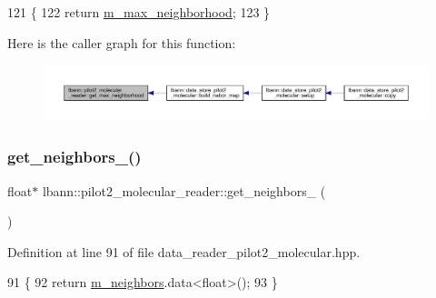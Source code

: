 \begin{DoxyCode}
121                                    \{
122     \textcolor{keywordflow}{return} \hyperlink{classlbann_1_1pilot2__molecular__reader_a0c9e71035cf47191002d1b164d056f50}{m\_max\_neighborhood};
123   \}
\end{DoxyCode}
Here is the caller graph for this function\+:\nopagebreak
\begin{figure}[H]
\begin{center}
\leavevmode
\includegraphics[width=350pt]{classlbann_1_1pilot2__molecular__reader_a1dcc424e004681f9287453df64bb751f_icgraph}
\end{center}
\end{figure}
\mbox{\label{classlbann_1_1pilot2__molecular__reader_a5f3ad4f22a32db2af4a8136fdc0579eb}} 
\subsubsection{\texorpdfstring{get\+\_\+neighbors\+\_()}{get\_neighbors\_4()}}
{\footnotesize\ttfamily float$\ast$ lbann\+::pilot2\+\_\+molecular\+\_\+reader\+::get\+\_\+neighbors\+\_ (\begin{DoxyParamCaption}{ }\end{DoxyParamCaption})\hspace{0.3cm}{\ttfamily [inline]}}



Definition at line 91 of file data\+\_\+reader\+\_\+pilot2\+\_\+molecular.\+hpp.


\begin{DoxyCode}
91                             \{
92     \textcolor{keywordflow}{return} \hyperlink{classlbann_1_1pilot2__molecular__reader_a0d8dc24b8ea66352a4d45a157b3a3c04}{m\_neighbors}.data<\textcolor{keywordtype}{float}>();
93   \}
\end{DoxyCode}
\mbox{\label{classlbann_1_1pilot2__molecular__reader_a9553eeece9aa1658cdc986b3ef803dea}} 
